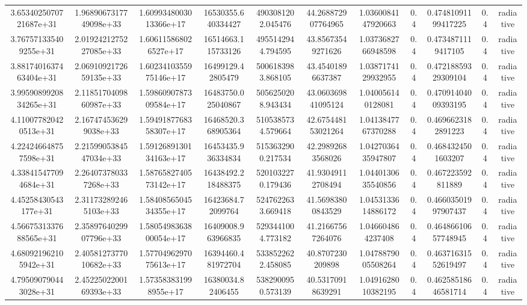 \begin{table}
\begin{tabular}{ccccccccccc}
3.6534025070721687e+31 & 1.9689067317749098e+33 & 1.6099348003013366e+17 & 16530355.640334427 & 4903081202.045476 & 44.268872907764965 & 1.0360084147920663 & 0.4 & 0.47481091199417225 & 0.4 & radiative \\
3.767571335409255e+31 & 2.0192421275227085e+33 & 1.606115868026527e+17 & 16514663.115733126 & 4955142944.794595 & 43.85673549271626 & 1.0373682766948598 & 0.4 & 0.4734871119417105 & 0.4 & radiative \\
3.8817401637463404e+31 & 2.0691092172659135e+33 & 1.6023410355975146e+17 & 16499129.42805479 & 5006183983.868105 & 43.45401896637387 & 1.0387174129932955 & 0.4 & 0.47218859329309104 & 0.4 & radiative \\
3.9959089920834265e+31 & 2.1185170409860987e+33 & 1.5986090787309584e+17 & 16483750.025040867 & 5056250208.943434 & 43.060369841095124 & 1.040056140128081 & 0.4 & 0.47091404009393195 & 0.4 & radiative \\
4.110077820420513e+31 & 2.167474536299038e+33 & 1.5949187768358307e+17 & 16468520.368905364 & 5105385734.579664 & 42.675448153021264 & 1.0413847767370288 & 0.4 & 0.4696623182891223 & 0.4 & radiative \\
4.224246648757598e+31 & 2.2159905384547034e+33 & 1.5912689130134163e+17 & 16453435.936334834 & 5153632900.217534 & 42.29892683568026 & 1.0427036435947807 & 0.4 & 0.4684324501603207 & 0.4 & radiative \\
4.338415477094684e+31 & 2.264073780337268e+33 & 1.5876582740573142e+17 & 16438492.218488375 & 5201032270.179436 & 41.93049112708494 & 1.0440130635540856 & 0.4 & 0.467223592811889 & 0.4 & radiative \\
4.45258430543177e+31 & 2.311732892465103e+33 & 1.5840856504534355e+17 & 16423684.72099764 & 5247622633.669418 & 41.56983800843529 & 1.0453133614886172 & 0.4 & 0.46603501997907437 & 0.4 & radiative \\
4.5667531337688565e+31 & 2.3589764029907796e+33 & 1.5805498363800054e+17 & 16409008.963966835 & 5293441004.773182 & 41.21667567264076 & 1.046604864237408 & 0.4 & 0.46486610657748945 & 0.4 & radiative \\
4.680921962105942e+31 & 2.4058127377010682e+33 & 1.5770496297075613e+17 & 16394460.481972704 & 5338522622.458085 & 40.8707230209898 & 1.0478879005508264 & 0.4 & 0.46371631552619497 & 0.4 & radiative \\
4.795090790443028e+31 & 2.4522502200169393e+33 & 1.573583831998955e+17 & 16380034.82406455 & 5382900950.573139 & 40.53170918639291 & 1.0491628010382195 & 0.4 & 0.46258518646581714 & 0.4 & radiative \\

\end{tabular}
\end{table}
